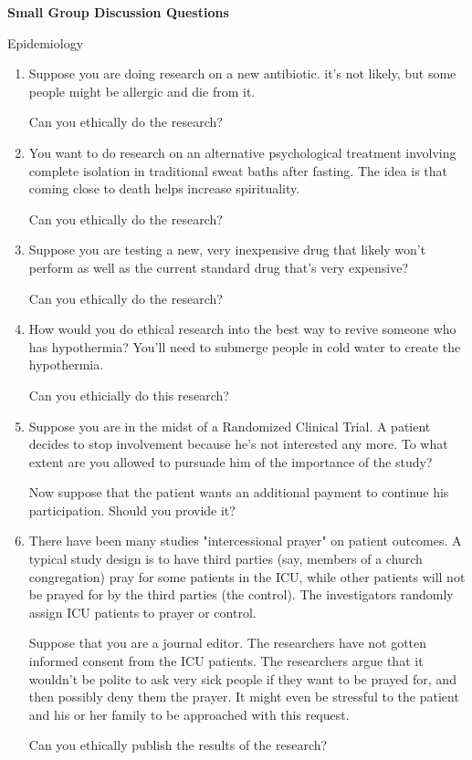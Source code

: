 \documentclass[12pt]{article}
\begin{document}
\vspace*{-1in}
\centerline{\Large \bfseries Small Group Discussion Questions}

\bigskip

\centerline{\large \sf Epidemiology}

\bigskip

\begin{enumerate}
\item Suppose you are doing research on a new antibiotic. it's not likely, but some people might be 
allergic and die from it. 

Can you ethically do the research? 
\item You want to do research on an alternative psychological treatment 
involving complete isolation in traditional sweat baths after fasting. The idea is that coming close to death helps increase spirituality.  

Can you ethically do the research?

\item Suppose you are testing a new, very inexpensive drug 
that likely won't perform as well as the current 
standard drug that's very expensive? 

Can you ethically do the research?

\item How would you do ethical research into the best way 
to revive someone who has hypothermia? You'll need to submerge people in cold water to create the hypothermia.

Can you ethicially do this research?

\item Suppose you are in the midst of a Randomized Clinical Trial.  A patient decides to stop involvement because he's not interested any more. To what extent are you allowed to pursuade him of the importance of the study?  

Now suppose that the patient wants an additional payment to continue his participation.  Should you provide it?

\item There have been many studies "intercessional prayer" on patient outcomes.  A typical study design is to have third parties  (say, members of a church congregation) pray for some patients in the ICU, while other patients will not be prayed for by the third parties (the control).  The investigators randomly assign ICU patients to prayer or control.

Suppose that you are a journal editor.  The researchers have not gotten informed consent from the ICU patients.  The researchers argue that it wouldn't be polite to ask very sick people if they want to be prayed for, and then possibly deny them the prayer.  It might even be stressful to the patient and his or her family to be approached with this request.

Can you ethically publish the results of the research?
\end{enumerate}
\end{document}
